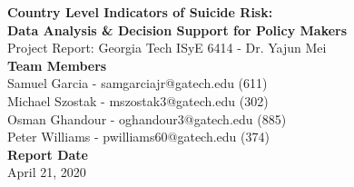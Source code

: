 \documentclass[]{article}
\author{}
\date{\vspace{-2.5em}}
\begin{document}
\begin{flushleft}
\LARGE{\textbf{Country Level Indicators of Suicide Risk:\\ Data Analysis \& Decision Support for Policy Makers}}\\
\vspace*{3\baselineskip}
\Large{Project Report: Georgia Tech ISyE 6414 - Dr. Yajun Mei}\\
\vspace*{3\baselineskip}
\large{\textbf{Team Members}}\\
Samuel Garcia - samgarciajr@gatech.edu (611)\\
Michael Szostak - mszostak3@gatech.edu (302)\\ 
Osman Ghandour - oghandour3@gatech.edu (885) \\ 
Peter Williams - pwilliams60@gatech.edu (374)\\
\vspace*{2\baselineskip}
\large{\textbf{Report Date}}\\
April 21, 2020
\newpage
\end{flushleft}

{
\setcounter{tocdepth}{3}
\tableofcontents
}
\newpage
\end{document}
